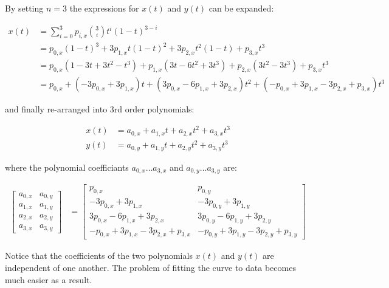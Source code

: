 By setting $n=3$ the expressions for $x(t)$ and $y(t)$ can be expanded:

\begin{align}
    x(t) &= \sum_{i=0}^3 p_{i,x} {3\choose i} t^i(1-t)^{3-i} \\
         &= p_{0,x}(1-t)^3 + 3p_{1,x}t(1-t)^2 + 3p_{2,x}t^2(1-t) + p_{3,x}t^3 \\
         &= p_{0,x}(1-3t+3t^2-t^3) + p_{1,x}(3t-6t^2+3t^3) + p_{2,x}(3t^2-3t^3) + p_{3,x}t^3 \\
         &= p_{0,x} + (-3p_{0,x} +3p_{1,x})t + (3p_{0,x} -6p_{1,x} +3p_{2,x})t^2 + (-p_{0,x}+3p_{1,x}-3p_{2,x}+p_{3,x})t^3
\end{align}

and finally re-arranged into 3rd order polynomials:

\begin{align}
    x(t) &= a_{0,x} + a_{1,x} t + a_{2,x} t^2 + a_{3,x} t^3 \label{eq:bezier_x} \\
    y(t) &= a_{0,y} + a_{1,y} t + a_{2,y} t^2 + a_{3,y} t^3 \label{eq:bezier_y}
\end{align}

where the polynomial coefficiants $a_{0,x} \ldots a_{3,x}$ and $a_{0,y} \ldots a_{3,y}$ are:

\begin{align}
    \begin{bmatrix}
        a_{0,x} & a_{0,y} \\
        a_{1,x} & a_{1,y} \\
        a_{2,x} & a_{2,y} \\
        a_{3,x} & a_{3,y}
    \end{bmatrix}
    &=
    \left[\begin{array}{ll}
        p_{0,x}                                   & p_{0,y} \\
        -3p_{0,x} + 3p_{1,x}                      & -3p_{0,y} + 3p_{1,y} \\
        3p_{0,x}  - 6p_{1,x} + 3p_{2,x}           & 3p_{0,y}  - 6p_{1,y} + 3p_{2,y} \\
        -p_{0,x}  + 3p_{1,x} - 3p_{2,x} + p_{3,x} & -p_{0,y}  + 3p_{1,y} - 3p_{2,y} + p_{3,y}
    \end{array}\right]
\end{align}

Notice that the coefficients of the two polynomials $x(t)$ and $y(t)$ are independent of one another. The problem of fitting the curve to data becomes much easier as a result.

